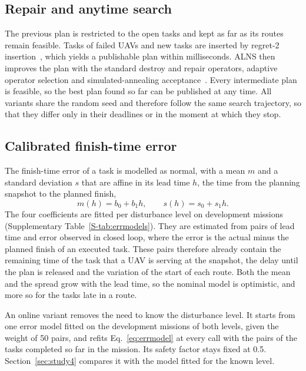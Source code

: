 \documentclass[a4paper,fleqn]{cas-dc}
\begin{document}
\subsection{Repair and anytime search}
The previous plan is restricted to the open tasks and kept as far as its routes remain feasible. Tasks of failed UAVs
and new tasks are inserted by regret-2 insertion~\cite{ropke2006adaptive}, which yields a publishable plan within
milliseconds. ALNS then improves the plan with the standard destroy and repair operators, adaptive operator selection
and simulated-annealing acceptance~\cite{ropke2006adaptive,mara2022alns}. Every intermediate plan is feasible, so the
best plan found so far can be published at any time. All variants share the random seed and therefore follow the same
search trajectory, so that they differ only in their deadlines or in the moment at which they stop.

\subsection{Calibrated finish-time error}
The finish-time error of a task is modelled as normal, with a mean $m$ and a standard deviation $s$ that are affine in
its lead time $h$, the time from the planning snapshot to the planned finish,
\begin{equation}\label{eq:errmodel}
m(h)=b_0+b_1h,\qquad s(h)=s_0+s_1h .
\end{equation}
The four coefficients are fitted per disturbance level on development missions (Supplementary
Table~\ref{S-tab:errmodels}). They are estimated from pairs of lead time and error observed in closed loop, where the
error is the actual minus the planned finish of an executed task. These pairs therefore already contain the remaining
time of the task that a UAV is serving at the snapshot, the delay until the plan is released and the variation of the
start of each route. Both the mean and the spread grow with the lead time, so the nominal model is optimistic, and more
so for the tasks late in a route.

An online variant removes the need to know the disturbance level. It starts from one error model fitted on the
development missions of both levels, given the weight of 50 pairs, and refits Eq.~\eqref{eq:errmodel} at every call with
the pairs of the tasks completed so far in the mission. Its safety factor stays fixed at 0.5. Section~\ref{sec:study4}
compares it with the model fitted for the known level.
\end{document}
